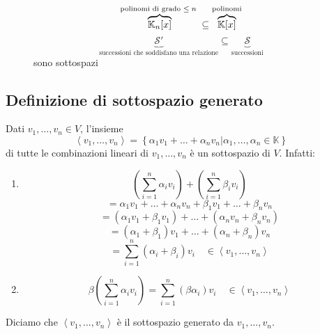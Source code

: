 \documentclass[a4paper]{article}
\theoremstyle{break}
\theoremstyle{break}
\theoremstyle{break}
\theoremstyle{break}
\begin{document}
  \begin{figure}[H]
    \begin{example}
      \[
      \overbrace{\mathbb{K}_n[x]}^{\text{polinomi di grado \( \le n \) }}
      \subseteq
      \overbrace{\mathbb{K}[x]}^{\text{polinomi}}
      \]  
      \[
        \underbrace{\mathcal{S'}}_{\text{successioni che soddisfano una relazione}}
        \subseteq
        \underbrace{\mathcal{S}}_{\text{successioni}}
      \] 
      sono sottospazi
    \end{example}
  \end{figure}

\subsection{Definizione di sottospazio generato}
\begin{definition}
  Dati \( v_1, \ldots, v_n  \in V\), l'insieme
  \[ \left< v_1, \ldots, v_n \right> = \left\{ \alpha_1 v_1 + \ldots + \alpha_n v_n | \alpha_1, \ldots, \alpha_n \in \mathbb{K} \right\}  \]
  di tutte le combinazioni lineari di \( v_1, \ldots, v_n \) è un sottospazio di \( V \).
  Infatti:
  \begin{enumerate}
    \item \[
        \left( \sum_{i=1}^n \alpha_i v_i \right) 
        +
        \left( \sum_{i=1}^n \beta_i v_i \right) 
      \] 
      \[
        = \alpha_1 v_1 + \ldots + \alpha_n v_n + \beta_1 v_1 + \ldots + \beta_n v_n
      \] 
      \[
        = (\alpha_1 v_1 + \beta_1 v_1) + \ldots + (\alpha_n v_n + \beta_n v_n)
      \] 
      \[
        = (\alpha_1 + \beta_1)v_1 + \ldots + (\alpha_n + \beta_n)v_n
      \] 
      \[
        = \sum_{i=1}^n (\alpha_i + \beta_i)v_i \quad \in \left< v_1, \ldots, v_n \right>
      \] 
    \item
      \[
        \beta \left( \sum_{i=1}^n \alpha_i v_i \right) = \sum_{i=1}^n (\beta \alpha_i)v_i \quad \in \left< v_1, \ldots, v_n \right>
      \] 
  \end{enumerate}
  Diciamo che \( \left< v_1, \ldots, v_n \right> \) è il sottospazio generato da \( v_1, \ldots, v_n \).
\end{definition}
\end{document}
